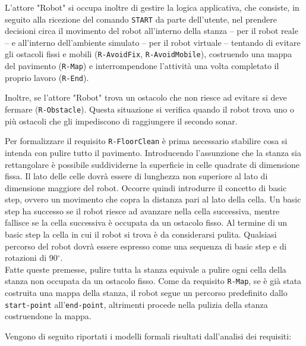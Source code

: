 \documentclass{llncs}
\newcommand{\version}{7}
\newcommand{\action}[1]{\texttt{#1}\xspace}
\newcommand{\code}[1]{{\color{blue}\small{\texttt{#1}}}}
\begin{document}
L'attore "Robot" si occupa inoltre di gestire la logica applicativa, che consiste, in seguito alla ricezione del comando \action{START} da parte dell'utente, nel prendere decisioni circa il movimento del robot all'interno della stanza – per il robot reale – e all'interno dell'ambiente simulato – per il robot virtuale – tentando di evitare gli ostacoli fissi e mobili (\code{R-AvoidFix}, \code{R-AvoidMobile}), costruendo una mappa del pavimento (\code{R-Map}) e interrompendone l'attività una volta completato il proprio lavoro (\code{R-End}).

Inoltre, se l'attore "Robot" trova un ostacolo che non riesce ad evitare si deve fermare (\code{R-Obstacle}).
Questa situazione si verifica quando il robot trova uno o più ostacoli che gli impediscono di raggiungere il secondo sonar.

Per formalizzare il requisito \code{R-FloorClean} è prima necessario stabilire cosa si intenda con pulire tutto il pavimento. Introducendo l'assunzione che la stanza sia rettangolare è possibile suddividerne la superficie in celle quadrate di dimensione fissa. Il lato delle celle dovrà essere di lunghezza non superiore al lato di dimensione maggiore del robot. Occorre quindi introdurre il concetto di basic step, ovvero un movimento che copra la distanza pari al lato della cella. Un basic step ha successo se il robot riesce ad avanzare nella cella successiva, mentre fallisce se la cella successiva è occupata da un ostacolo fisso. Al termine di un basic step la cella in cui il robot si trova è da considerarsi pulita. Qualsiasi percorso del robot dovrà essere espresso come una sequenza di basic step e di rotazioni di 90$^{\circ}$. \\ Fatte queste premesse, pulire tutta la stanza equivale a pulire ogni cella della stanza non occupata da un ostacolo fisso. Come da requisito \code{R-Map}, se è già stata costruita una mappa della stanza, il robot segue un percorso predefinito dallo \code{start-point} all'\code{end-point}, altrimenti procede nella pulizia della stanza costruendone la mappa. 

Vengono di seguito riportati i modelli formali risultati dall'analisi dei requisiti:



\end{document}

